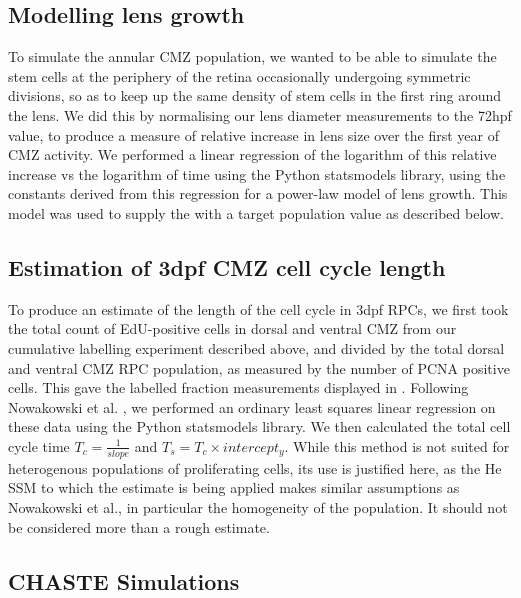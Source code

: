 \subsection{Modelling lens growth}
To simulate the annular CMZ population, we wanted to be able to simulate the stem cells at the periphery of the retina occasionally undergoing symmetric divisions, so as to keep up the same density of stem cells in the first ring around the lens. We did this by normalising our lens diameter measurements to the 72hpf value, to produce a measure of relative increase in lens size over the first year of CMZ activity. We performed a linear regression of the logarithm of this relative increase vs the logarithm of time using the Python statsmodels library, using the constants derived from this regression for a power-law model of lens growth. This model was used to supply the  with a target population value as described below.

\subsection{Estimation of 3dpf CMZ cell cycle length}
To produce an estimate of the length of the cell cycle in 3dpf RPCs, we first took the total count of EdU-positive cells in dorsal and ventral CMZ from our cumulative labelling experiment described above, and divided by the total dorsal and ventral CMZ RPC population, as measured by the number of PCNA positive cells. This gave the labelled fraction measurements displayed in . Following Nowakowski et al. \cite{Nowakowski1989}, we performed an ordinary least squares linear regression on these data using the Python statsmodels library. We then calculated the total cell cycle time $T_c = \frac{1}{slope}$ and $T_s = T_c \times intercept_y$. While this method is not suited for heterogenous populations of proliferating cells, its use is justified here, as the He SSM to which the estimate is being applied makes similar assumptions as Nowakowski et al., in particular the homogeneity of the population. It should not be considered more than a rough estimate.

\subsection{CHASTE Simulations}
\label{ssec:CHASTEsims}
